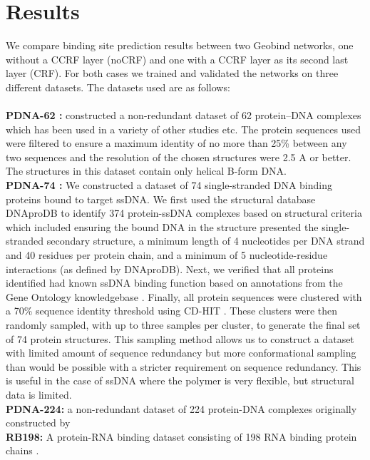 \section{Results} We compare binding site prediction results between two Geobind networks, one
without a CCRF layer (noCRF) and one with a CCRF layer as its second last layer (CRF). For both
cases we trained and validated the networks on three different datasets. The datasets used are as
follows:\\ \\ \textbf{PDNA-62 :} \citet{ahmad2004analysis} constructed a non-redundant dataset of 62
protein–DNA complexes which has been used in a variety of other studies
\citep{kuznetsov2006transient, wang2006bindn} etc. The protein sequences used were filtered to
ensure a maximum identity of no more than 25\% between any two sequences and the resolution of the
chosen structures were 2.5 A or better. The structures in this dataset contain only helical B-form
DNA.\\ \textbf{PDNA-74 :} We constructed a dataset of 74 single-stranded DNA binding proteins bound
to target ssDNA. We first used the structural database DNAproDB
\citep{sagendorf2017dnaprodb,sagendorf2020dnaprodb} to identify 374 protein-ssDNA complexes based on
structural criteria which included ensuring the bound DNA in the structure presented the
single-stranded secondary structure, a minimum length of 4 nucleotides per DNA strand and 40
residues per protein chain, and a minimum of 5 nucleotide-residue interactions (as defined by
DNAproDB). Next, we verified that all proteins identified had known ssDNA binding function based on
annotations from the Gene Ontology knowledgebase \citep{gene2019gene}.  Finally, all protein
sequences were clustered with a 70\% sequence identity threshold using CD-HIT \citep{li2006cd}.
These clusters were then randomly sampled, with up to three samples per cluster, to generate the
final set of 74 protein structures. This sampling method allows us to construct a dataset with
limited amount of sequence redundancy but more conformational sampling than would be possible with a
stricter requirement on sequence redundancy. This is useful in the case of ssDNA where the polymer
is very flexible, but structural data is limited.\\ \textbf{PDNA-224:} a non-redundant dataset of
        224 protein-DNA complexes originally constructed by \citet{li2013predna}\\ \textbf{RB198: }
        A protein-RNA binding dataset consisting of 198 RNA binding protein chains
        \citep{walia2012protein}.

